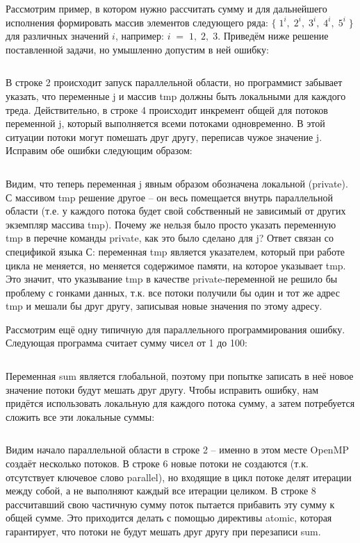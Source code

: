 Рассмотрим пример, в котором нужно рассчитать сумму и для дальнейшего исполнения формировать массив элементов следующего ряда: $\{\;1^i,\;2^i,\;3^i,\;4^i,\;5^i\;\}$ для различных значений $i$, например: $i\;=\;1,\;2,\;3$. Приведём ниже решение поставленной задачи, но умышленно допустим в ней ошибку:

\inputminted{c++}{listings/OpenMPExample8.cpp}

В строке 2 происходит запуск параллельной области, но программист забывает указать, что переменные j и массив tmp должны быть локальными для каждого треда. Действительно, в строке 4 происходит инкремент общей для потоков переменной j, который выполняется всеми потоками одновременно. В этой ситуации потоки могут помешать друг другу, переписав чужое значение j. Исправим обе ошибки следующим образом:

\inputminted{c++}{listings/OpenMPExample9.cpp}

Видим, что теперь переменная j явным образом обозначена локальной (private). С массивом tmp решение другое – он весь помещается внутрь параллельной области (т.е. у каждого потока будет свой собственный не зависимый от других экземпляр массива tmp). Почему же нельзя было просто указать переменную tmp в перечне команды private, как это было сделано для j? Ответ связан со спецификой языка С: переменная tmp является указателем, который при работе цикла не меняется, но меняется содержимое памяти, на которое указывает tmp. Это значит, что указывание tmp в качестве private-переменной не решило бы проблему с гонками данных, т.к. все потоки получили бы один и тот же адрес tmp и мешали бы друг другу, записывая новые значения по этому адресу.

Рассмотрим ещё одну типичную для параллельного программирования ошибку. Следующая программа считает сумму чисел от 1 до 100:

\inputminted{c++}{listings/OpenMPExample10.cpp}

Переменная sum является глобальной, поэтому при попытке записать в неё новое значение потоки будут мешать друг другу. Чтобы исправить ошибку, нам придётся использовать локальную для каждого потока сумму, а затем потребуется сложить все эти локальные суммы:

\inputminted{c++}{listings/OpenMPExample11.cpp}

Видим начало параллельной области в строке 2 – именно в этом месте OpenMP создаёт несколько потоков. В строке 6 новые потоки не создаются (т.к. отсутствует ключевое слово parallel), но входящие в цикл потоке делят итерации между собой, а не выполняют каждый все итерации целиком. В строке 8 рассчитавший свою частичную сумму поток пытается прибавить эту сумму к общей сумме. Это приходится делать с помощью директивы atomic, которая гарантирует, что потоки не будут мешать друг другу при перезаписи sum. 

